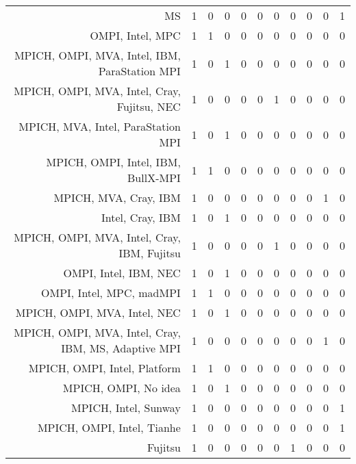 {\begin{landscape}
\begin{longtable}[htb]{r|c|c|c|c|c|c|c|c|c|c}
{MS} & 1 & 0 & 0 & 0 & 0 & 0 & 0 & 0 & 0 & 1 \\%
{OMPI, Intel, MPC} & 1 & 1 & 0 & 0 & 0 & 0 & 0 & 0 & 0 & 0 \\%
{MPICH, OMPI, MVA, Intel, IBM, ParaStation MPI} & 1 & 0 & 1 & 0 & 0 & 0 & 0 & 0 & 0 & 0 \\%
{MPICH, OMPI, MVA, Intel, Cray, Fujitsu, NEC} & 1 & 0 & 0 & 0 & 0 & 1 & 0 & 0 & 0 & 0 \\%
{MPICH, MVA, Intel, ParaStation MPI} & 1 & 0 & 1 & 0 & 0 & 0 & 0 & 0 & 0 & 0 \\%
{MPICH, OMPI, Intel, IBM, BullX-MPI} & 1 & 1 & 0 & 0 & 0 & 0 & 0 & 0 & 0 & 0 \\%
{MPICH, MVA, Cray, IBM} & 1 & 0 & 0 & 0 & 0 & 0 & 0 & 0 & 1 & 0 \\%
{Intel, Cray, IBM} & 1 & 0 & 1 & 0 & 0 & 0 & 0 & 0 & 0 & 0 \\%
{MPICH, OMPI, MVA, Intel, Cray, IBM, Fujitsu} & 1 & 0 & 0 & 0 & 0 & 1 & 0 & 0 & 0 & 0 \\%
{OMPI, Intel, IBM, NEC} & 1 & 0 & 1 & 0 & 0 & 0 & 0 & 0 & 0 & 0 \\%
{OMPI, Intel, MPC, madMPI} & 1 & 1 & 0 & 0 & 0 & 0 & 0 & 0 & 0 & 0 \\%
{MPICH, OMPI, MVA, Intel, NEC} & 1 & 0 & 1 & 0 & 0 & 0 & 0 & 0 & 0 & 0 \\%
{MPICH, OMPI, MVA, Intel, Cray, IBM, MS, Adaptive MPI} & 1 & 0 & 0 & 0 & 0 & 0 & 0 & 0 & 1 & 0 \\%
{MPICH, OMPI, Intel, Platform} & 1 & 1 & 0 & 0 & 0 & 0 & 0 & 0 & 0 & 0 \\%
{MPICH, OMPI, No idea} & 1 & 0 & 1 & 0 & 0 & 0 & 0 & 0 & 0 & 0 \\%
{MPICH, Intel, Sunway} & 1 & 0 & 0 & 0 & 0 & 0 & 0 & 0 & 0 & 1 \\%
{MPICH, OMPI, Intel, Tianhe} & 1 & 0 & 0 & 0 & 0 & 0 & 0 & 0 & 0 & 1 \\%
{Fujitsu} & 1 & 0 & 0 & 0 & 0 & 0 & 1 & 0 & 0 & 0 \\%
\hline%
\end{longtable}%
\end{landscape}}%
\clearpage%
